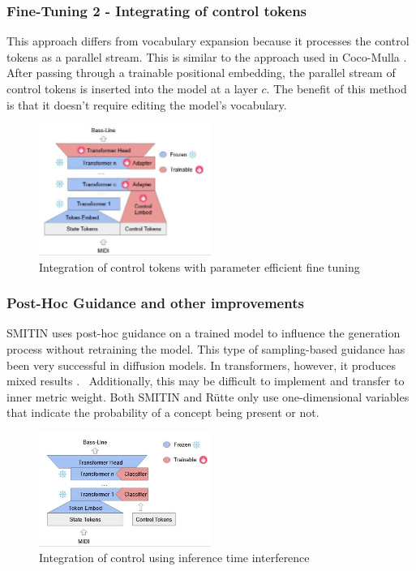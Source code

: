 \subsubsection{Fine-Tuning 2 - Integrating of control tokens} 

This approach differs from vocabulary expansion because it processes the control tokens as a parallel stream. This is similar to the approach used in Coco-Mulla \cite{Lin_cocomulla_2024}. After passing through a trainable positional embedding, the parallel stream of control tokens is inserted into the model at a layer $c$. The benefit of this method is that it doesn't require editing the model's vocabulary. 
 
\begin{figure}[H]
    \centering
    \includegraphics[width=0.5\textwidth]{IMAGES/ControlTokensLora.jpg} 
    \caption{Integration of control tokens with parameter efficient fine tuning}
    \label{fig:controltok}
\end{figure}

\subsubsection{Post-Hoc Guidance and other improvements}

SMITIN\cite{Koo_Wichern_Germain_SMITIN_2024} uses post-hoc guidance on a trained model to influence the generation process without retraining the model. This type of sampling-based guidance has been very successful in diffusion models. In transformers, however, it produces mixed results \cite{language_guide_rutte_2024}.  Additionally, this may be difficult to implement and transfer to inner metric weight. Both SMITIN and Rütte\cite{language_guide_rutte_2024} only use one-dimensional variables that indicate the probability of a concept being present or not. 

\begin{figure}[H]
    \centering
    \includegraphics[width=0.5\textwidth]{IMAGES/adhoccontrol.jpg} 
    \caption{Integration of control using inference time interference}
    \label{fig:adhoccontrol}
\end{figure}

